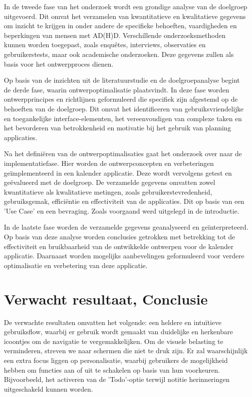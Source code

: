 In de tweede fase van het onderzoek wordt een grondige analyse van de doelgroep uitgevoerd. Dit omvat het verzamelen van kwantitatieve en kwalitatieve gegevens om inzicht te krijgen in onder andere de specifieke behoeften, vaardigheden en beperkingen van mensen met AD(H)D. Verschillende onderzoeksmethoden kunnen worden toegepast, zoals enquêtes, interviews, observaties en gebruikerstests, maar ook academische onderzoeken. Deze gegevens zullen als basis voor het ontwerpproces dienen. \newline 

Op basis van de inzichten uit de literatuurstudie en de doelgroepanalyse begint de derde fase, waarin ontwerpoptimalisatie plaatsvindt. In deze fase worden ontwerpprincipes en richtlijnen geformuleerd die specifiek zijn afgestemd op de behoeften van de doelgroep. Dit omvat het identificeren van gebruiksvriendelijke en toegankelijke interface-elementen, het vereenvoudigen van complexe taken en het bevorderen van betrokkenheid en motivatie bij het gebruik van planning applicaties. \newline 

Na het definiëren van de ontwerpoptimalisaties gaat het onderzoek over naar de implementatiefase. Hier worden de ontwerpconcepten en verbeteringen geïmplementeerd in een kalender applicatie. Deze wordt vervolgens getest en geëvalueerd met de doelgroep. De verzamelde gegevens omvatten zowel kwantitatieve als kwalitatieve metingen, zoals gebruikerstevredenheid, gebruiksgemak, efficiëntie en effectiviteit van de applicaties.  
Dit op basis van een 'Use Case' en een bevraging. Zoals voorgaand werd uitgelegd in de introductie. \newline 

In de laatste fase worden de verzamelde gegevens geanalyseerd en geïnterpreteerd. Op basis van deze analyse worden conclusies getrokken met betrekking tot de effectiviteit en bruikbaarheid van de ontwikkelde ontwerpen voor de kalender applicatie.
Daarnaast worden mogelijks aanbevelingen geformuleerd voor verdere optimalisatie en verbetering van deze applicatie.


\section{Verwacht resultaat, Conclusie}%
\label{sec:verwachte_resultaten_conclusie}

De verwachte resultaten omvatten het volgende: een heldere en intuïtieve gebruiksflow, waarbij er gebruik wordt gemaakt van duidelijke en herkenbare icoontjes om de navigatie te vergemakkelijken. Om de visuele belasting te verminderen, streven we naar schermen die niet te druk zijn. \newline
Er zal waarschijnlijk een extra focus liggen op personalisatie, waarbij gebruikers de mogelijkheid hebben om functies aan of uit te schakelen op basis van hun voorkeuren. Bijvoorbeeld, het activeren van de 'Todo'-optie terwijl notitie herinneringen uitgeschakeld kunnen worden. \newline

